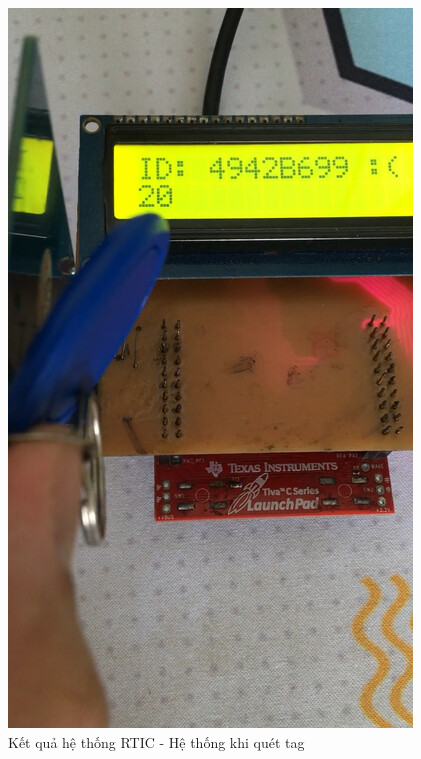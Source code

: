 \begin{figure}[ht]
\centering
\includegraphics[scale=0.4]{images/rtic_tag.jpg}
\caption{Kết quả hệ thống RTIC - Hệ thống khi quét tag}
\label{fig:rtic_tag}
\end{figure}

